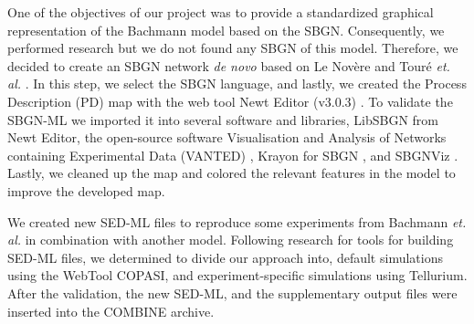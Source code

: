 One of the objectives of our project was to provide a standardized graphical representation of the Bachmann model based on the SBGN. Consequently, we performed research but we do not found any SBGN of this model. Therefore, we decided to create an SBGN network \textit{de novo} based on Le Novère \cite{sbgnnovere} and Touré \textit{et. al.} \cite{sbgntoure}. In this step, we select the SBGN language, and lastly, we created the Process Description (PD) map with the web tool Newt Editor (v3.0.3) \cite{newteditor}. To validate the SBGN-ML we imported it into several software and libraries, LibSBGN from Newt Editor, the open-source software Visualisation and Analysis of Networks containing Experimental Data (VANTED) \cite{vanted}, Krayon for SBGN \cite{krayon}, and SBGNViz \cite{sbgnviz}. Lastly, we cleaned up the map and colored the relevant features in the model to improve the developed map.

We created new SED-ML files to reproduce some experiments from Bachmann  \textit{et. al.} in combination with another model. Following research for tools for building SED-ML files, we determined to divide our approach into, default simulations using the WebTool COPASI, and experiment-specific simulations using Tellurium. After the validation, the new  SED-ML, and the supplementary output files were inserted into the COMBINE archive.